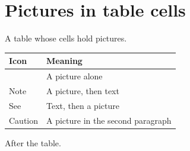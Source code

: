 \documentclass[11pt,a4paper]{article}
\begin{document}
\section{Pictures in table cells}

A table whose cells hold pictures.

\begin{table}[h]
\begin{tabular}{|l|l|}
\hline
Icon & Meaning \\ \hline
 & A picture alone \\ \hline
Note & A picture, then text \\ \hline
See  %
 & Text, then a picture \\ \hline
Caution  %
 & A picture in the second paragraph \\ \hline
\end{tabular}
\end{table}

After the table.

\begin{figure}[h]
\end{figure}
\end{document}
